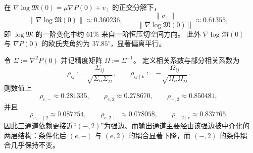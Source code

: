 \begin{remark}\label{rem:real-input-40-vperp-angle}
在 \(\nabla\log\mathfrak{M}(0)=\mu\nabla P(0)+v_\perp\) 的正交分解下，
\[
\|\nabla\log\mathfrak{M}(0)\|\approx 0.360236,\qquad
\frac{\|v_\perp\|}{\|\nabla\log\mathfrak{M}(0)\|}\approx 0.61355,
\]
即 \(\log\mathfrak{M}\) 的一阶变化中约 \(61\%\) 来自一阶恒压切空间方向。
此外 \(\nabla\log\mathfrak{M}(0)\) 与 \(\nabla P(0)\) 的欧氏夹角约为 \(37.85^\circ\)，显著偏离平行。
\end{remark}

\begin{proposition}\label{prop:real-input-40-precision-matrix-mediation}
令 \(\Sigma:=\nabla^2P(0)\) 并记精度矩阵 \(\Omega:=\Sigma^{-1}\)。
定义相关系数与部分相关系数为
\[
\rho_{ij}:=\frac{\Sigma_{ij}}{\sqrt{\Sigma_{ii}\Sigma_{jj}}},
\qquad
\rho_{ij\mid k}:=-\frac{\Omega_{ij}}{\sqrt{\Omega_{ii}\Omega_{jj}}}.
\]
则数值上
\[
\rho_{e,-}\approx 0.281335,\qquad
\rho_{e,2}\approx 0.278670,\qquad
\rho_{-,2}\approx 0.850481,
\]
并且
\[
\rho_{e,-\mid 2}\approx 0.087754,\qquad
\rho_{e,2\mid -}\approx 0.078058,\qquad
\rho_{-,2\mid e}\approx 0.837765.
\]
因此三通道依赖更接近“\((-,2)\)”为强边、而输出通道主要经由该强边被中介化的两层结构：条件化后 \((e,-)\) 与 \((e,2)\) 的耦合显著下降，而 \((-,2)\) 的条件耦合几乎保持不变。
\end{proposition}

